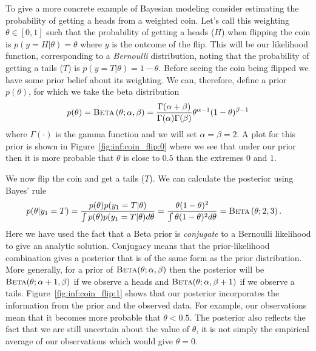 To give a more concrete example of Bayesian modeling consider estimating
the probability of getting a heads from a weighted coin.  Let's call this weighting $\theta \in [0,1]$ such
that the probability of getting a heads  ($H$)  when flipping the coin is $p(y=H | \theta)=\theta$
where $y$ is the outcome of the flip.  This will be our likelihood function, corresponding to a
\emph{Bernoulli} distribution, noting that the probability
of getting a tails ($T$) is $p(y = T | \theta) = 1-\theta$.
Before seeing the coin being flipped we have some prior belief about its weighting.  We
can, therefore, define a prior $p(\theta)$, for which we take the beta distribution
\begin{align}
\label{eq:bayes:beta}
p(\theta) = \textsc{Beta}\left(\theta ; \alpha,\beta\right) = \frac{\Gamma(\alpha+\beta)}{\Gamma (\alpha) \Gamma(\beta)}
\theta^{\alpha-1} (1-\theta)^{\beta-1}
\end{align}
where $\Gamma(\cdot)$ is the gamma function and we will set $\alpha=\beta=2$.  
A plot for this prior is shown in Figure~\ref{fig:inf:coin_flip:0}
where we see that under our prior then it is more probable that $\theta$ is close to $0.5$ than the
extremes $0$ and $1$.  

We now flip the coin and get a tails ($T$).  We can calculate the posterior using Bayes' rule
\begin{align}
p(\theta | y_1 = T) &= \frac{p(\theta) p(y_1=T | \theta)}{\int p(\theta) p(y_1=T | \theta) d\theta} = \frac{\theta (1-\theta)^2}{\int \theta (1-\theta)^2 d\theta} = \textsc{Beta}\left(\theta ; 2,3\right) \label{eq:prob:beta_post_1}.
\end{align}
Here we have used the fact that a Beta prior is \emph{conjugate} to a Bernoulli likelihood
to give an analytic solution.  Conjugacy means that the prior-likelihood combination gives
a posterior that is of the same form as the prior distribution.  More generally, for a prior of
$\textsc{Beta}(\theta ; \alpha, \beta)$ then the posterior will be $\textsc{Beta}(\theta ; \alpha+1, \beta)$
if we observe a heads and $\textsc{Beta}(\theta ; \alpha, \beta+1)$ if we observe a tails.
Figure~\ref{fig:inf:coin_flip:1} shows that our
posterior incorporates the information from the prior and the observed data.  For example, our observations mean that it becomes more probable that $\theta<0.5$.  The posterior
also reflects the fact that we are still uncertain about the value of $\theta$, it is not simply the
empirical average of our observations which would give $\theta=0$.

